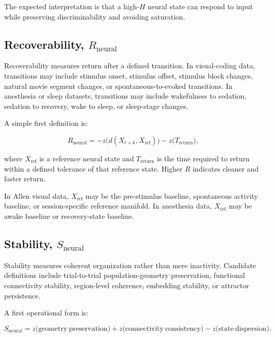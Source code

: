 \documentclass[11pt]{article}
\begin{document}
The expected interpretation is that a high-$H$ neural state can respond to input while preserving discriminability and avoiding saturation.

\subsection{Recoverability, $R_{\mathrm{neural}}$}

Recoverability measures return after a defined transition. In visual-coding data, transitions may include stimulus onset, stimulus offset, stimulus block changes, natural movie segment changes, or spontaneous-to-evoked transitions. In anesthesia or sleep datasets, transitions may include wakefulness to sedation, sedation to recovery, wake to sleep, or sleep-stage changes.

A simple first definition is:

\begin{equation}
R_{\mathrm{neural}} = -z\bigl(d(X_{t+k}, X_{\mathrm{ref}})\bigr) - z\bigl(T_{\mathrm{return}}\bigr),
\end{equation}

where $X_{\mathrm{ref}}$ is a reference neural state and $T_{\mathrm{return}}$ is the time required to return within a defined tolerance of that reference state. Higher $R$ indicates cleaner and faster return.

In Allen visual data, $X_{\mathrm{ref}}$ may be the pre-stimulus baseline, spontaneous activity baseline, or session-specific reference manifold. In anesthesia data, $X_{\mathrm{ref}}$ may be awake baseline or recovery-state baseline.

\subsection{Stability, $S_{\mathrm{neural}}$}

Stability measures coherent organization rather than mere inactivity. Candidate definitions include trial-to-trial population-geometry preservation, functional connectivity stability, region-level coherence, embedding stability, or attractor persistence.

A first operational form is:

\begin{equation}
S_{\mathrm{neural}} = z\bigl(\mathrm{geometry\ preservation}\bigr) + z\bigl(\mathrm{connectivity\ consistency}\bigr) - z\bigl(\mathrm{state\ dispersion}\bigr).
\end{equation}
\end{document}
